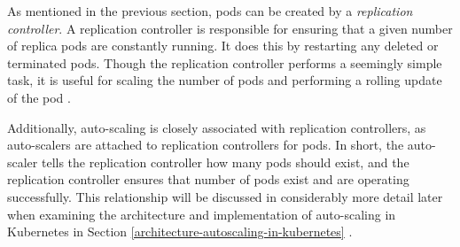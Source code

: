 As mentioned in the previous section, pods can be created by a
\textit{replication controller}. A replication controller
is responsible for ensuring that a given
number of replica pods are constantly running. It does this by restarting any
deleted or terminated pods. Though the replication controller performs a
seemingly simple task, it is useful for scaling the number of pods and
performing a rolling update of the pod \cite{k8s-replication-controllers}.

Additionally, auto-scaling is closely associated with replication controllers, as
auto-scalers are attached to replication controllers for pods. In short, the
auto-scaler tells the replication controller how many pods should exist, and the
replication controller ensures that number of pods exist and are operating
successfully. This relationship will be discussed in considerably more detail later when
examining the architecture and implementation of auto-scaling in Kubernetes in
Section \ref{architecture-autoscaling-in-kubernetes}
\cite{k8s-horizontal-pod-autoscaler-proposal}.

